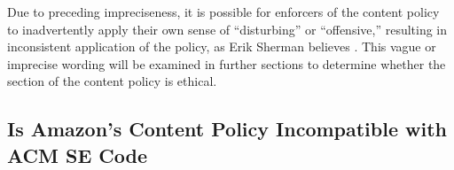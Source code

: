 \documentclass[11pt]{article}
\begin{document}
\begin{multicols}{2}
Due to preceding impreciseness, it is possible for enforcers of the content policy to inadvertently apply their own sense of ``disturbing'' or ``offensive,'' resulting in inconsistent application of the policy, as Erik Sherman believes \cite{ShermanAmazonExecs}.  This vague or imprecise wording will be examined in further sections to determine whether the section of the content policy is ethical.




\subsection{Is Amazon's Content Policy Incompatible with ACM SE Code}


\end{multicols}
\end{document}
